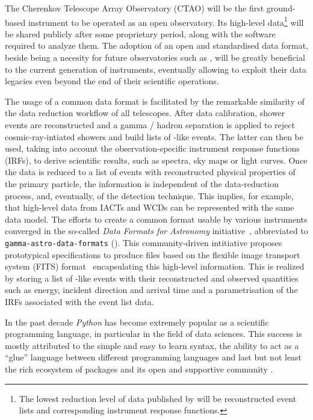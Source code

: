 \documentclass[longauth]{aa}
\begin{document}
The Cherenkov Telescope Array Observatory (CTAO) will be the first ground-based
\gammaray instrument to be operated as an open observatory.
Its high-level data\footnote{The lowest reduction level of data published by \cta will be reconstructed event lists and corresponding instrument response functions.}
will be shared publicly after some proprietary period, along with the software required to analyze them.
The adoption of an open and standardised \gammaray data format, beside being a necesity for future observatories such as \cta,
will be greatly beneficial to the current generation of instruments, eventually allowing to exploit their data legacies even
beyond the end of their scientific operations.

The usage of a common data format is facilitated by the remarkable similarity of the data reduction workflow of all \gammaray telescopes.
After data calibration, shower events are reconstructed and
a gamma / hadron separation is applied to reject cosmic-ray-intiated showers and build lists of \gammaray-like events.
The latter can then be used, taking into account the observation-specific instrument response functions (IRFs),
to derive scientific results, such as spectra, sky maps or light curves.
Once the data is reduced to a list of events with reconstructed physical properties of the primary particle,
the information is independent of the data-reduction process, and, eventually, of the detection technique. This implies,
for example, that high-level data from IACTs and WCDs can be represented
with the same data model.
The efforts to create a common format usable by various instruments
converged in the so-called \textit{Data Formats for \gammaray Astronomy}
initiative~\citep{gadf_proc,gadf_universe}, abbreviated to
\texttt{gamma-astro-data-formats} (\gadf). This community-driven intitiative proposes prototypical
specifications to produce files based on the flexible image transport system
(FITS) format~\citep{fits} encapsulating this high-level information. This is
realized by storing a list of \gammaray-like events with their reconstructed and observed
quantities such as energy, incident direction and arrival time and a parametrisation of
the IRFs associated with the event list data. %

In the past decade \textit{Python} has become extremely popular as a scientific programming language,
in particular in the field of data sciences. This success is
mostly attributed to the simple and easy to learn syntax, the ability to act as
a \enquote{glue} language between different programming languages and last but not least
the rich ecosystem of packages and its open and supportive community \citep{Momcheva2015}.
\end{document}
